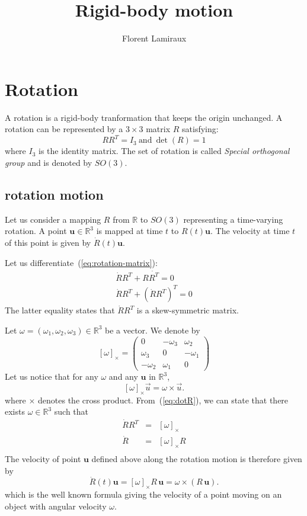 \documentclass{article}
\title{Rigid-body motion}
\author{Florent Lamiraux}
\date{}
\newcommand\vect[1]{\mathbf{#1}}
\newcommand\reals{\mathbb{R}}
\begin{document}
\maketitle

\section{Rotation}

A rotation is a rigid-body tranformation that keeps the origin unchanged. A rotation can be
represented by a $3\times3$ matrix $R$ satisfying:
\begin{equation}\label{eq:rotation-matrix}
RR^T = I_3 \ \mbox{and}\ \det(R) = 1
\end{equation}
where $I_3$ is the identity matrix.
The set of rotation is called \textit{Special orthogonal group} and is denoted by $SO(3)$.

\subsection{rotation motion}

Let us consider a mapping $R$ from $\reals$ to $SO(3)$ representing a time-varying rotation.
A point $\vect{u}\in\reals^3$ is mapped at time $t$ to $R(t)\vect{u}$. The velocity at time $t$
of this point is given by $\dot{R}(t)\vect{u}$.

Let us differentiate~(\ref{eq:rotation-matrix}):
\begin{eqnarray}
  \dot{R} R^T + R \dot{R^T} = 0 \\
  \dot{R} R^T + (\dot{R}R^T)^T = 0
  \label{eq:dotR}
\end{eqnarray}
The latter equality states that $\dot{R}R^T$ is a skew-symmetric matrix.

Let $\omega=(\omega_1,\omega_2,\omega_3)\in\reals^3$ be a vector. We denote by
\begin{equation}\label{eq:skew-symmetric}
  \left[\omega\right]_{\times} = \left(\begin{array}{ccc}
    0 & -\omega_3 & \omega_2 \\
    \omega_3 & 0 & -\omega_1 \\
    -\omega_2 & \omega_1 & 0
  \end{array}\right)
\end{equation}
Let us notice that for any $\omega$ and any $\vect{u}$ in $\reals^3$,
$$
\left[\omega\right]_{\times}\vec{u} = \omega\times\vec{u}.
$$
where $\times$ denotes the cross product.
From~(\ref{eq:dotR}), we can state that there exists $\omega\in\reals^3$ such that
\begin{eqnarray*}
\dot{R}R^T &=& \left[\omega\right]_{\times}\\
\dot{R} &=& \left[\omega\right]_{\times} R\\
\end{eqnarray*}
The velocity of point $\vect{u}$ defined above along the rotation motion is therefore given by
$$
\dot{R}(t)\vect{u} = \left[\omega\right]_{\times} R\,\vect{u} = \omega\times(R\,\vect{u}).
$$
which is the well known formula giving the velocity of a point moving on an object with angular velocity $\omega$.
\end{document}
